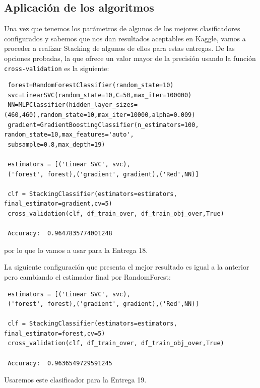 \documentclass[a4paper,11pt]{article}
\begin{document}
 \subsection{Aplicación de los algoritmos}
 Una vez que tenemos los parámetros de algunos de los mejores clasificadores configurados y sabemos que nos dan resultados aceptables en Kaggle, vamos a proceder a realizar Stacking de algunos de ellos para estas entregas. De las opciones probadas, la que ofrece un valor mayor de la precisión usando la función \texttt{cross-validation} es la siguiente:
 \begin{verbatim}
 forest=RandomForestClassifier(random_state=10)
 svc=LinearSVC(random_state=10,C=50,max_iter=100000)
 NN=MLPClassifier(hidden_layer_sizes=(460,460),random_state=10,max_iter=10000,alpha=0.009)
 gradient=GradientBoostingClassifier(n_estimators=100, random_state=10,max_features='auto',
 subsample=0.8,max_depth=19)
 
 estimators = [('Linear SVC', svc),
 ('forest', forest),('gradient', gradient),('Red',NN)]
 
 clf = StackingClassifier(estimators=estimators, final_estimator=gradient,cv=5)
 cross_validation(clf, df_train_over, df_train_obj_over,True)
 
 Accuracy:  0.9647835774001248
 \end{verbatim}
 
 por lo que lo vamos a usar para la Entrega 18. 
 
 La siguiente configuración que presenta el mejor resultado es igual a la anterior pero cambiando el estimador final por RandomForest:
 
 \begin{verbatim}
 estimators = [('Linear SVC', svc),
 ('forest', forest),('gradient', gradient),('Red',NN)]
 
 clf = StackingClassifier(estimators=estimators, final_estimator=forest,cv=5)
 cross_validation(clf, df_train_over, df_train_obj_over,True)
 
 Accuracy:  0.9636549729591245
 \end{verbatim}
  
  Usaremos este clasificador para la Entrega 19. 
  \newpage
\end{document}
